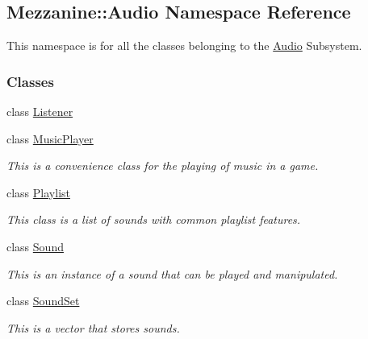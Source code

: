 \hypertarget{namespaceMezzanine_1_1Audio}{
\subsection{Mezzanine::Audio Namespace Reference}
\label{namespaceMezzanine_1_1Audio}
}


This namespace is for all the classes belonging to the \hyperlink{namespaceMezzanine_1_1Audio}{Audio} Subsystem.  


\subsubsection*{Classes}
\begin{DoxyCompactItemize}
\item 
class \hyperlink{classMezzanine_1_1Audio_1_1Listener}{Listener}
\item 
class \hyperlink{classMezzanine_1_1Audio_1_1MusicPlayer}{MusicPlayer}
\begin{DoxyCompactList}\small\item\em This is a convenience class for the playing of music in a game. \item\end{DoxyCompactList}\item 
class \hyperlink{classMezzanine_1_1Audio_1_1Playlist}{Playlist}
\begin{DoxyCompactList}\small\item\em This class is a list of sounds with common playlist features. \item\end{DoxyCompactList}\item 
class \hyperlink{classMezzanine_1_1Audio_1_1Sound}{Sound}
\begin{DoxyCompactList}\small\item\em This is an instance of a sound that can be played and manipulated. \item\end{DoxyCompactList}\item 
class \hyperlink{classMezzanine_1_1Audio_1_1SoundSet}{SoundSet}
\begin{DoxyCompactList}\small\item\em This is a vector that stores sounds. \item\end{DoxyCompactList}\end{DoxyCompactItemize}
